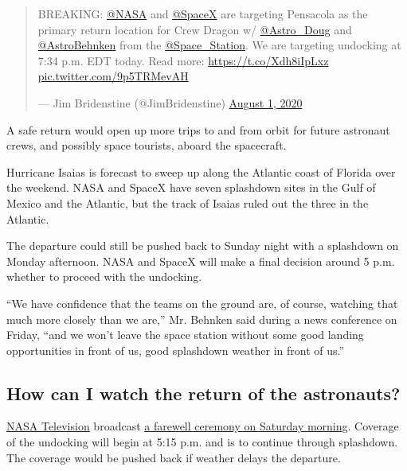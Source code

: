 \begin{quote}
BREAKING: \href{https://twitter.com/NASA?ref_src=twsrc\%5Etfw}{@NASA}
and \href{https://twitter.com/SpaceX?ref_src=twsrc\%5Etfw}{@SpaceX} are
targeting Pensacola as the primary return location for Crew Dragon w/
\href{https://twitter.com/Astro_Doug?ref_src=twsrc\%5Etfw}{@Astro\_Doug}
and
\href{https://twitter.com/AstroBehnken?ref_src=twsrc\%5Etfw}{@AstroBehnken}
from the
\href{https://twitter.com/Space_Station?ref_src=twsrc\%5Etfw}{@Space\_Station}.
We are targeting undocking at 7:34 p.m. EDT today. Read more:
\url{https://t.co/Xdh8iIpLxz}
\href{https://t.co/9p5TRMevAH}{pic.twitter.com/9p5TRMevAH}

--- Jim Bridenstine (@JimBridenstine)
\href{https://twitter.com/JimBridenstine/status/1289617675572969472?ref_src=twsrc\%5Etfw}{August
1, 2020}
\end{quote}

A safe return would open up more trips to and from orbit for future
astronaut crews, and possibly space tourists, aboard the spacecraft.

Hurricane Isaias is forecast to sweep up along the Atlantic coast of
Florida over the weekend. NASA and SpaceX have seven splashdown sites in
the Gulf of Mexico and the Atlantic, but the track of Isaias ruled out
the three in the Atlantic.

The departure could still be pushed back to Sunday night with a
splashdown on Monday afternoon. NASA and SpaceX will make a final
decision around 5 p.m. whether to proceed with the undocking.

``We have confidence that the teams on the ground are, of course,
watching that much more closely than we are,'' Mr. Behnken said during a
news conference on Friday, ``and we won't leave the space station
without some good landing opportunities in front of us, good splashdown
weather in front of us.''

\hypertarget{how-can-i-watch-the-return-of-the-astronauts}{%
\subsection{How can I watch the return of the
astronauts?}\label{how-can-i-watch-the-return-of-the-astronauts}}

\href{https://www.nasa.gov/multimedia/nasatv/\#public}{NASA Television}
broadcast \href{https://twitter.com/NASA/status/1289548827012333570}{a
farewell ceremony on Saturday morning}. Coverage of the undocking will
begin at 5:15 p.m. and is to continue through splashdown. The coverage
would be pushed back if weather delays the departure.

